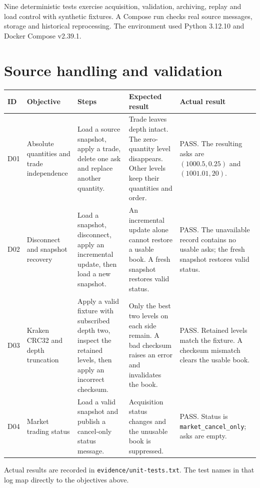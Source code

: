 \documentclass[10pt,a4paper]{article}
\begin{document}

Nine deterministic tests exercise acquisition, validation, archiving, replay and load control with synthetic fixtures. A Compose run checks real source messages, storage and historical reprocessing. The environment used Python 3.12.10 and Docker Compose v2.39.1.

\section{Source handling and validation}
\small
\begin{tabularx}{\linewidth}{@{}P{7mm}P{25mm}LLL@{}}
\toprule
\textbf{ID} & \textbf{Objective} & \textbf{Steps} & \textbf{Expected result} & \textbf{Actual result}\\
\midrule
D01 & Absolute quantities and trade independence & Load a source snapshot, apply a trade, delete one ask and replace another quantity. & Trade leaves depth intact. The zero-quantity level disappears. Other levels keep their quantities and order. & PASS. The resulting asks are $(1000.5,0.25)$ and $(1001.01,20)$.\\\addlinespace
D02 & Disconnect and snapshot recovery & Load a snapshot, disconnect, apply an incremental update, then load a new snapshot. & An incremental update alone cannot restore a usable book. A fresh snapshot restores valid status. & PASS. The unavailable record contains no usable asks; the fresh snapshot restores valid status.\\\addlinespace
D03 & Kraken CRC32 and depth truncation & Apply a valid fixture with subscribed depth two, inspect the retained levels, then apply an incorrect checksum. & Only the best two levels on each side remain. A bad checksum raises an error and invalidates the book. & PASS. Retained levels match the fixture. A checksum mismatch clears the usable book.\\\addlinespace
D04 & Market trading status & Load a valid snapshot and publish a cancel-only status message. & Acquisition status changes and the unusable book is suppressed. & PASS. Status is \texttt{market\_cancel\_only}; asks are empty.\\
\bottomrule
\end{tabularx}
\normalsize

\medskip
Actual results are recorded in \texttt{evidence/unit-tests.txt}. The test names in that log map directly to the objectives above.

\newpage
\end{document}
